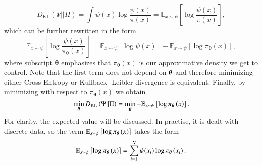 \begin{equation}
D_{\mathrm{KL}} \left(\Psi || \Pi \right) = \int \psi(x)\log\frac{\psi(x)}{\pi(x)} = \mathbb{E}_{x\sim \psi} \left[\log\frac{\psi(x)}{\pi(x)} \right],
\end{equation}
which can be further rewritten in the form
\begin{equation}
	 \mathbb{E}_{x\sim \psi} \left[\log\frac{\psi(x)}{\pi_{\boldsymbol{\theta}}(x)} \right] = \mathbb{E}_{x\sim \psi} \left[\log \psi(x) \right] - \mathbb{E}_{x\sim \psi} \left[\log \pi_{\boldsymbol{\theta}}(x) \right],
	\end{equation}
where subscript $\boldsymbol{\theta}$ emphasizes that $\pi_{\boldsymbol{\theta}}(x)$ is our approximative density we get to control. Note that
the first term does not depend on $\boldsymbol{\theta}$ and therefore minimizing either Cross-Entropy or Kullback-
Leibler divergence is equivalent. Finally, by minimizing with respect to $\pi_{\boldsymbol{\theta}}(x)$ we obtain
\begin{equation}
\min_{\boldsymbol{\theta}} D_{\mathrm{KL}} \left(\Psi || \Pi \right) = \min_{\boldsymbol{\theta}} - \mathbb{E}_{x\sim \psi}\left[\log \pi_{\boldsymbol{\theta}}\left(x\right)\right].
\end{equation}
For clarity, the expected value will be discussed. In practise, it is dealt with discrete data, so the term  $\mathbb{E}_{x\sim \psi}\left[\log \pi_{\boldsymbol{\theta}}\left(x\right)\right]$ takes the form
\begin{equation}
    \mathbb{E}_{x\sim \psi}\left[\log \pi_{\boldsymbol{\theta}}\left(x\right)\right] = \sum_{i=1}^N \psi(x_i)\log\pi_{\boldsymbol{\theta}}\left(x_i\right).
\end{equation}
